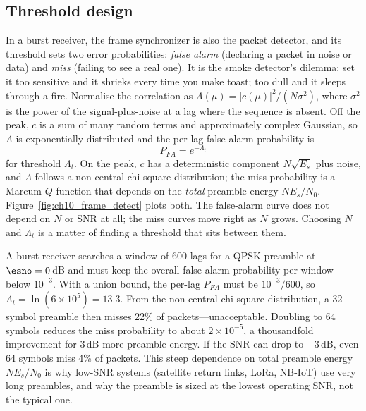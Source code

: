 \subsection{Threshold design}

In a burst receiver, the frame synchronizer is also the packet detector, and its threshold sets two
error probabilities: \emph{false alarm} (declaring a packet in noise or data) and \emph{miss} (failing
to see a real one). It is the smoke detector's dilemma: set it too sensitive and it shrieks every
time you make toast; too dull and it sleeps through a fire. Normalise the correlation as
$\Lambda(\mu)=|c(\mu)|^2/(N\sigma^2)$, where $\sigma^2$ is the power of the signal-plus-noise at a
lag where the sequence is absent. Off the peak, $c$ is a sum of many random terms and approximately
complex Gaussian, so $\Lambda$ is exponentially distributed and the per-lag false-alarm probability is
\begin{equation}
P_{FA}=e^{-\Lambda_t}
\end{equation}
for threshold $\Lambda_t$. On the peak, $c$ has a deterministic component $N\sqrt{E_s}$ plus noise, and
$\Lambda$ follows a non-central chi-square distribution; the miss probability is a Marcum $Q$-function
that depends on the \emph{total} preamble energy $NE_s/N_0$. Figure~\ref{fig:ch10_frame_detect} plots
both. The false-alarm curve does not depend on $N$ or SNR at all; the miss curves move right as $N$
grows. Choosing $N$ and $\Lambda_t$ is a matter of finding a threshold that sits between them.


\begin{worked}
A burst receiver searches a window of 600 lags for a QPSK preamble at $\esno=0$\,dB and must keep
the overall false-alarm probability per window below $10^{-3}$. With a union bound, the per-lag
$P_{FA}$ must be $10^{-3}/600$, so $\Lambda_t=\ln(6\times10^5)=13.3$. From the non-central chi-square
distribution, a 32-symbol preamble then misses 22\% of packets---unacceptable. Doubling to 64 symbols
reduces the miss probability to about $2\times10^{-5}$, a thousandfold improvement for 3\,dB more
preamble energy. If the SNR can drop to $-3$\,dB, even 64 symbols miss 4\% of packets. This steep
dependence on total preamble energy $NE_s/N_0$ is why low-SNR systems (satellite return links, LoRa,
NB-IoT) use very long preambles, and why the preamble is sized at the lowest operating SNR, not the
typical one.
\end{worked}

